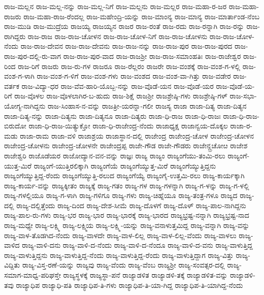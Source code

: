 ರಾಜ-ಮಲ್ಲನ
ರಾಜ-ಮಲ್ಲ-ನನ್ನು
ರಾಜ-ಮಲ್ಲ-ನಿಗೆ
ರಾಜ-ಮಲ್ಲನು
ರಾಜ-ಮಲ್ಲರ
ರಾಜ-ಮಹಾ-ರ-ಜರ
ರಾಜ-ಮಹಾ-ರಾಜರು
ರಾಜ-ಮಹಾ-ರಾಜ-ರೆಂದಲ್ಲ
ರಾಜ-ಮಹೇಂದ್ರಿ-ಯನ್ನು
ರಾಜ-ಮಾಂನ್ಯ
ರಾಜ-ಮಾನ್ಯ
ರಾಜ-ಮಾರ್ತಾಂಡ-ನೆಂಬ
ರಾಜ-ಮುಡಿ
ರಾಜ-ಮುದ್ರೆಯ
ರಾಜಯ್ಯ
ರಾಜಯ್ಯನ
ರಾಜರ
ರಾಜ-ರಂತೆ
ರಾಜ-ರದು
ರಾಜ-ರನ್ನಾಗಿ
ರಾಜ-ರನ್ನು
ರಾಜ-ರಾಗಿದ್ದರು
ರಾಜ-ರಾಜ
ರಾಜ-ರಾಜ-ಚೋಳನ
ರಾಜ-ರಾಜ-ಚೋಳ-ನಿಗೆ
ರಾಜ-ರಾಜ-ಚೋಳನು
ರಾಜ-ರಾಜ-ಚೋಳ-ನೆಂದು
ರಾಜ-ರಾಜ-ದೇವನ
ರಾಜ-ರಾಜ-ದೇವನು
ರಾಜ-ರಾಜ-ನನ್ನು
ರಾಜ-ರಾಜ-ಪುರ
ರಾಜ-ರಾಜ-ಪುರದ
ರಾಜ-ರಾಜ-ಪುರ-ದಲ್ಲಿ-ರು-ವಾಗ
ರಾಜ-ರಾಜ-ಪುರ-ವಾದ
ರಾಜ-ರಾಜಶ್ರೀ
ರಾಜ-ರಾಜ-ಸಮಾಂಹತಿಃ
ರಾಜ-ರಾಜೇಶ್ವರ
ರಾಜ-ರಿಂದ
ರಾಜ-ರಿಗೆ
ರಾಜರು
ರಾಜ-ರು-ಗಳ
ರಾಜರೂ
ರಾಜ-ರೆಲ್ಲರಂ
ರಾಜರೇ
ರಾಜ-ವಂಶಕ್ಕೆ
ರಾಜ-ವಂಶ-ಗ-ಳಲ್ಲಿ
ರಾಜ-ವಂಶ-ಗ-ಳಾಗಿ
ರಾಜ-ವಂಶ-ಗ-ಳಿಗೆ
ರಾಜ-ವಂಶ-ಗಳು
ರಾಜ-ವಂಶದ
ರಾಜ-ವಂಶ-ವಾ-ಗಿತ್ತು
ರಾಜ-ವಡೇರ
ರಾಜ-ವರ್ತಕ
ರಾಜ-ವಿದ್ಯಾ-ಧರ
ರಾಜ-ವೆವ-ಹಾರಿ-ಯೊಬ್ಬ-ನನ್ನು
ರಾಜ-ವೊಡೆ-ಯನ
ರಾಜ-ವೊಡೆ-ಯರ
ರಾಜ-ವೊಡೆ-ಯ-ರಿಗೆ
ರಾಜ-ವೊಳಲ
ರಾಜ-ವೊಳಲಾಗಿರ-ಬ-ಹುದು
ರಾಜ-ಶಿಕ್ಷೆ
ರಾಜಶ್ರೀ
ರಾಜಶ್ರೇಷ್ಠಿ-ಗಳು
ರಾಜಶ್ರೇಷ್ಠಿ-ಗಳ್
ರಾಜ-ಸಭಾ-ಯೋಗ್ಯ-ನಾಗಿದ್ದನು
ರಾಜ-ಸಿಂಹಾಸ-ನ-ವನ್ನು
ರಾಜತ್ರೀ-ಯರನ್ನಾ-ಗಲೀ
ರಾಜಸ್ಯ
ರಾಜಾ
ರಾಜಾ-ದಿತ್ಯ
ರಾಜಾ-ದಿತ್ಯನ
ರಾಜಾ-ದಿತ್ಯ-ನನ್ನು
ರಾಜಾ-ದಿತ್ಯನು
ರಾಜಾ-ದಿತ್ಯನೂ
ರಾಜಾ-ದಿತ್ಯರು
ರಾಜಾ-ಧಿ-ರಾಜ
ರಾಜಾ-ಧಿ-ರಾಜಃ
ರಾಜಾ-ಧಿ-ರಾಜ-ಬಿರುದೋ
ರಾಜಾ-ಧಿ-ರಾಜ-ಯಿತ್ಯುಕ್ತೋ
ರಾಜಾ-ಧಿ-ರಾಜೇಂದ್ರ-ನೆಂದು
ರಾಜಾಧ್ಯಕ್ಷ
ರಾಜಾನ್ವಯ-ದೊಕ್ಕಲ
ರಾಜಾ-ರ-ಮಡು
ರಾಜಾ-ರಾಮ
ರಾಜಾ-ವಳಿ
ರಾಜಾಶ್ರಯ
ರಾಜಾಸ್ಥಾನ-ದಲ್ಲಿ
ರಾಜೇಂದ್ರ
ರಾಜೇಂದ್ರ-ಚೋಳ
ರಾಜೇಂದ್ರ-ಚೋಳನ
ರಾಜೇಂದ್ರ-ಚೋಳನು
ರಾಜೇಂದ್ರ-ಚೋಳನೇ
ರಾಜೇಂದ್ರಪ್ಪ
ರಾಜೇ-ಗೌಡ
ರಾಜೇ-ಗೌಡರು
ರಾಜೇನ್ದ್ರಚೋೞ
ರಾಜೇಶ
ರಾಜೇಶ್ವರಿ
ರಾಜೊಡೆಯರ
ರಾಜೋದ್ಯಾನ-ವನ-ವನ್ನು
ರಾಜ್ಞಃ
ರಾಜ್ಯ
ರಾಜ್ಯಂ
ರಾಜ್ಯಂಗೆಯು-ತಂಮಿ-ರಲು
ರಾಜ್ಯಂಗೆ-ಯುತ್ತ-ಮಿರೆ
ರಾಜ್ಯಂಗೆ-ಯುತ್ತಿರಲಿಕ್ಕಾಗಿ
ರಾಜ್ಯಂಗೆಯೆ
ರಾಜ್ಯಂಗೆಯ್ಯುತ್ತ-ಮಿರೆ
ರಾಜ್ಯಂಗೆಯ್ಯುತ್ತಿದ್ದನು
ರಾಜ್ಯಂಗೆಯ್ಯುತ್ತಿದ್ದ-ರೆಂದು
ರಾಜ್ಯಂಗೆಯ್ಯುತ್ತಿ-ರಲುದ
ರಾಜ್ಯಂಗೆಯ್ಯೆ
ರಾಜ್ಯಂಗೈ-ಉತ್ತಮಿ-ರಲು
ರಾಜ್ಯ-ಕಾರ್ಯಕ್ಕಾಗಿ
ರಾಜ್ಯ-ಕಾರ್ಯ-ವನ್ನು
ರಾಜ್ಯಕ್ಕೀತಂ
ರಾಜ್ಯಕ್ಕೆ
ರಾಜ್ಯ-ಗತಂ
ರಾಜ್ಯ-ಗಳ
ರಾಜ್ಯ-ಗಳನ್ನಾಗಿ
ರಾಜ್ಯ-ಗ-ಳನ್ನು
ರಾಜ್ಯ-ಗ-ಳಲ್ಲಿ
ರಾಜ್ಯ-ಗಳಲ್ಲಿಯೂ
ರಾಜ್ಯ-ಗ-ಳಾಗಿ
ರಾಜ್ಯ-ಗಳಿಗೂ
ರಾಜ್ಯ-ಗಳು
ರಾಜ್ಯ-ಚಿಹ್ನೆಯೂ
ರಾಜ್ಯ-ತಂತ್ರ-ಗಳೂ
ರಾಜ್ಯದ
ರಾಜ್ಯ-ದಲ್ಲಿ
ರಾಜ್ಯ-ದಲ್ಲಿತ್ತೆಂದು
ರಾಜ್ಯ-ದಿಂದ
ರಾಜ್ಯ-ದೇಶ-ಸೀಮೆ
ರಾಜ್ಯ-ದೊಳಗೆ
ರಾಜ್ಯ-ದೊಳ್
ರಾಜ್ಯ-ಪಾಲ-ನಾಗಿದ್ದನು
ರಾಜ್ಯ-ಪಾಲ-ರು-ಗಳು
ರಾಜ್ಯ-ಭರ
ರಾಜ್ಯ-ಭಾರ
ರಾಜ್ಯ-ಭಾರಕ್ಕೆ
ರಾಜ್ಯ-ಭಾರದ
ರಾಜ್ಯಭ್ರಷ್ಟ-ನನ್ನಾಗಿ
ರಾಜ್ಯಭ್ರಷ್ಟ-ನಾದ
ರಾಜ್ಯ-ಮಧ್ಯೇ
ರಾಜ್ಯ-ಲಕ್ಷ್ಮಿ
ರಾಜ್ಯ-ಲಕ್ಷ್ಮಿಯ
ರಾಜ್ಯ-ಲಕ್ಷ್ಮಿ-ಯನ್ನು
ರಾಜ್ಯ-ವನಾಳುತ್ತಮಿದ್ದ
ರಾಜ್ಯ-ವನ್ನಾಗಿ
ರಾಜ್ಯ-ವನ್ನು
ರಾಜ್ಯ-ವಾಳ-ತೊಡಗಿದ-ನೆಂದು
ರಾಜ್ಯ-ವಾಳದೇ
ರಾಜ್ಯ-ವಾಳ-ಲಿಲ್ಲ
ರಾಜ್ಯ-ವಾಳ-ಲಿಲ್ಲ-ವೆಂದು
ರಾಜ್ಯ-ವಾಳಲು
ರಾಜ್ಯ-ವಾಳಿದ
ರಾಜ್ಯ-ವಾಳಿ-ದನು
ರಾಜ್ಯ-ವಾಳಿ-ದ-ನೆಂದು
ರಾಜ್ಯ-ವಾಳಿ-ದ-ನೆಂದೂ
ರಾಜ್ಯ-ವಾಳಿ-ದ-ವನು
ರಾಜ್ಯ-ವಾಳುತ್ತಿದ್ದ
ರಾಜ್ಯ-ವಾಳುತ್ತಿದ್ದನು
ರಾಜ್ಯ-ವಾಳುತ್ತಿದ್ದ-ನೆಂದು
ರಾಜ್ಯ-ವಾಳುತ್ತಿದ್ದ-ರೆಂದು
ರಾಜ್ಯ-ವಾಳುತ್ತಿದ್ದಾಗ
ರಾಜ್ಯ-ವಿತ್ತು
ರಾಜ್ಯ-ವಿದ್ದಿತು
ರಾಜ್ಯ-ವಿಸ್ತ-ರಣೆ-ಯನ್ನು
ರಾಜ್ಯವು
ರಾಜ್ಯ-ವೆಂದು
ರಾಜ್ಯ-ವೆಂಬ
ರಾಜ್ಯಶ್ರೀ
ರಾಜ್ಯ-ಸಂವತ್ಸರ-ದಲ್ಲಿ
ರಾಜ್ಯ-ಸಮಾಗ-ಮಾಧ್ವ-ಪರಿಘಸ್ತೇ
ರಾಜ್ಯಸ್ಥಳಕ್ಕೆ
ರಾಜ್ಯಸ್ಥಾ-ಪನೆ
ರಾಜ್ಯಾಡಳಿತ
ರಾಜ್ಯಾಡಳಿ-ತಕ್ಕೆ
ರಾಜ್ಯಾಡಳಿತ-ವನ್ನು
ರಾಜ್ಯಾಡಳಿ-ತವು
ರಾಜ್ಯಾಧಿಪ
ರಾಜ್ಯಾಧಿ-ಪತಿ
ರಾಜ್ಯಾಧಿಪ-ತಿ-ಗಳು
ರಾಜ್ಯಾಧಿಪ-ತಿ-ಯಾ-ಗಿದ್ದ
ರಾಜ್ಯಾಧಿಪ-ತಿ-ಯಾಗಿದ್ದ-ನೆಂದು
